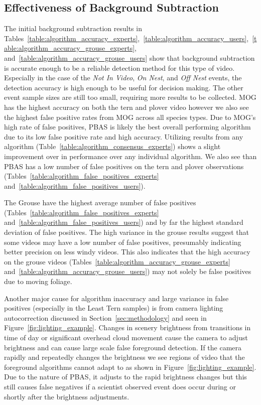 \subsection{Effectiveness of Background Subtraction}
\label{sec:results_effectiveness}

The initial background subtraction results in Tables~\ref{table:algorithm_accuracy_experts},~\ref{table:algorithm_accuracy_users},~\ref{table:algorithm_accuracy_grouse_experts}, and~\ref{table:algorithm_accuracy_grouse_users} show that background subtraction is accurate enough to be a reliable detection method for this type of video. Especially in the case of the \emph{Not In Video}, \emph{On Nest}, and \emph{Off Nest} events, the detection accuracy is high enough to be useful for decision making. The other event sample sizes are still too small, requiring more results to be collected. MOG has the highest accuracy on both the tern and plover video however we also see the highest false positive rates from MOG across all species types. Due to MOG's high rate of false positives, PBAS is likely the best overall performing algorithm due to its low false positive rate and high accuracy. Utilizing results from any algorithm (Table~\ref{table:algorithm_consensus_experts}) shows a slight improvement over in performance over any individual algorithm. We also see than PBAS has a low number of false positives on the tern and plover observations (Tables~\ref{table:algorithm_false_positives_experts} and~\ref{table:algorithm_false_positives_users}).

The Grouse have the highest average number of false positives (Tables~\ref{table:algorithm_false_positives_experts} and~\ref{table:algorithm_false_positives_users}) and by far the highest standard deviation of false positives. The high variance in the grouse results suggest that some videos may have a low number of false positives, presumably indicating better precision on less windy videos. This also indicates that the high accuracy on the grouse videos (Tables~\ref{table:algorithm_accuracy_grouse_experts} and~\ref{table:algorithm_accuracy_grouse_users}) may not solely be false positives due to moving foliage.

Another major cause for algorithm inaccuracy and large variance in false positives (especially in the Least Tern samples) is from camera lighting autocorrection discussed in Section~\ref{sec:methodology} and seen in Figure~\ref{fig:lighting_example}. Changes in scenery brightness from transitions in time of day or significant overhead cloud movement cause the camera to adjust brightness and can cause large scale false foreground detection. If the camera rapidly and repeatedly changes the brightness we see regions of video that the foreground algorithms cannot adapt to as shown in Figure~\ref{fig:lighting_example}. Due to the nature of PBAS, it adjusts to the rapid brightness changes but this still causes false negatives if a scientist observed event does occur during or shortly after the brightness adjustments.

